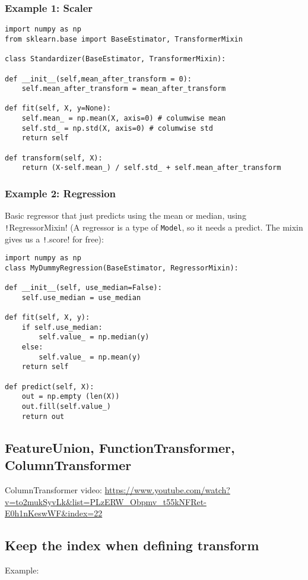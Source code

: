 \documentclass[11pt]{article}
\theoremstyle{definition}
\begin{document}
\subsubsection{Example 1: Scaler}
\begin{verbatim}
import numpy as np
from sklearn.base import BaseEstimator, TransformerMixin

class Standardizer(BaseEstimator, TransformerMixin):

def __init__(self,mean_after_transform = 0):
    self.mean_after_transform = mean_after_transform
    
def fit(self, X, y=None):
    self.mean_ = np.mean(X, axis=0) # columwise mean
    self.std_ = np.std(X, axis=0) # columwise std
    return self
    
def transform(self, X):
    return (X-self.mean_) / self.std_ + self.mean_after_transform
\end{verbatim}
\subsubsection{Example 2: Regression}
Basic regressor that just predicts using the mean or median, using  \texttt!RegressorMixin! (A regressor is a type of \texttt{Model}, so it needs a predict. The mixin gives us a \texttt!.score! for free):
\begin{verbatim}
import numpy as np
class MyDummyRegression(BaseEstimator, RegressorMixin):

def __init__(self, use_median=False):
    self.use_median = use_median
    
def fit(self, X, y):
    if self.use_median:
        self.value_ = np.median(y)
    else:
        self.value_ = np.mean(y)
    return self
    
def predict(self, X):
    out = np.empty (len(X))
    out.fill(self.value_)
    return out
\end{verbatim}

\subsection{FeatureUnion, FunctionTransformer, ColumnTransformer}
ColumnTransformer video: \url{https://www.youtube.com/watch?v=to2mukSyvLk&list=PLzERW_Obpmv_t55kNFRet-E0h1nKeswWF&index=22}

\subsection{Keep the index when defining transform}
Example:
\end{document}
